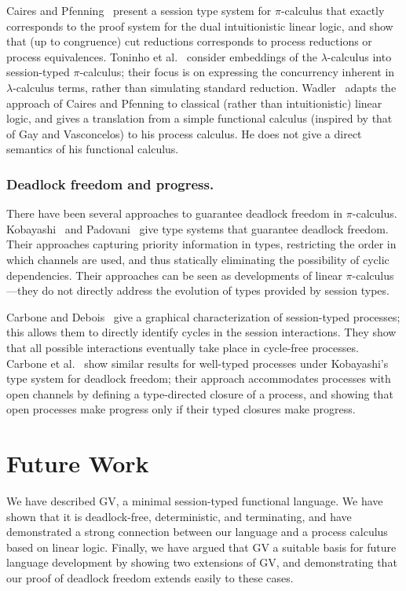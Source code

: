 \documentclass[oribibl,orivec,envcountsame]{llncs}
\begin{document}
Caires and Pfenning~\cite{CairesPfenning10} present a session type system for $\pi$-calculus that
exactly corresponds to the proof system for the dual intuitionistic linear logic, and show that (up
to congruence) cut reductions corresponds to process reductions or process equivalences.  Toninho et
al.~\cite{ToninhoCP12} consider embeddings of the $\lambda$-calculus into session-typed
$\pi$-calculus; their focus is on expressing the concurrency inherent in $\lambda$-calculus terms,
rather than simulating standard reduction.  Wadler~\cite{Wadler14} adapts the approach of Caires and
Pfenning to classical (rather than intuitionistic) linear logic, and gives a translation from a
simple functional calculus (inspired by that of Gay and Vasconcelos) to his process calculus.  He
does not give a direct semantics of his functional calculus.

\subsubsection{Deadlock freedom and progress.}

There have been several approaches to guarantee deadlock freedom in $\pi$-calculus.
Kobayashi~\cite{Kobayashi06} and Padovani~\cite{Padovani14} give type systems that guarantee
deadlock freedom.  Their approaches capturing priority information in types, restricting the order
in which channels are used, and thus statically eliminating the possibility of cyclic dependencies.
Their approaches can be seen as developments of linear $\pi$-calculus---they do not directly address
the evolution of types provided by session types.

Carbone and Debois~\cite{Carbone10} give a graphical characterization of session-typed processes;
this allows them to directly identify cycles in the session interactions.  They show that all
possible interactions eventually take place in cycle-free processes.  Carbone et
al.~\cite{CarboneDM14} show similar results for well-typed processes under Kobayashi's type system
for deadlock freedom; their approach accommodates processes with open channels by defining a
type-directed closure of a process, and showing that open processes make progress only if their
typed closures make progress.

\section{Future Work}\label{sec:conclusion}

We have described GV, a minimal session-typed functional language.  We have shown that it is
deadlock-free, deterministic, and terminating, and have demonstrated a strong connection between our
language and a process calculus based on linear logic.  Finally, we have argued that GV a suitable
basis for future language development by showing two extensions of GV, and demonstrating that our
proof of deadlock freedom extends easily to these cases.
\end{document}

